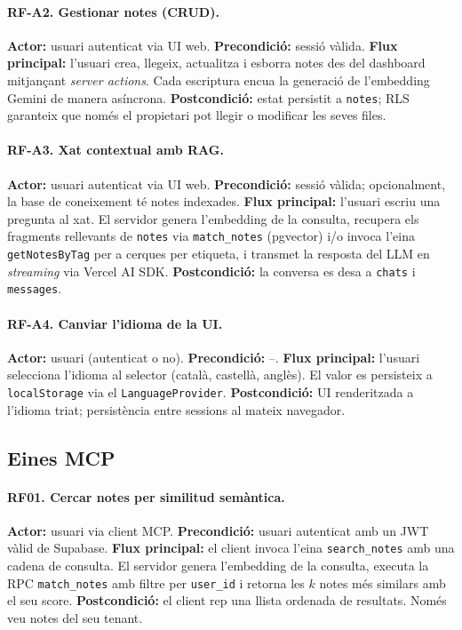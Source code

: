 \paragraph{RF-A2. Gestionar notes (CRUD).}
\textbf{Actor:} usuari autenticat via UI web.
\textbf{Precondició:} sessió vàlida.
\textbf{Flux principal:} l'usuari crea, llegeix, actualitza i esborra
notes des del dashboard mitjançant \emph{server actions}. Cada
escriptura encua la generació de l'embedding Gemini de manera
asíncrona.
\textbf{Postcondició:} estat persistit a \texttt{notes}; RLS garanteix
que només el propietari pot llegir o modificar les seves files.

\paragraph{RF-A3. Xat contextual amb RAG.}
\textbf{Actor:} usuari autenticat via UI web.
\textbf{Precondició:} sessió vàlida; opcionalment, la base de
coneixement té notes indexades.
\textbf{Flux principal:} l'usuari escriu una pregunta al xat. El
servidor genera l'embedding de la consulta, recupera els fragments
rellevants de \texttt{notes} via \texttt{match\_notes} (pgvector)
i/o invoca l'eina \texttt{getNotesByTag} per a cerques per etiqueta,
i transmet la resposta del LLM en \emph{streaming} via Vercel AI SDK.
\textbf{Postcondició:} la conversa es desa a \texttt{chats} i
\texttt{messages}.

\paragraph{RF-A4. Canviar l'idioma de la UI.}
\textbf{Actor:} usuari (autenticat o no).
\textbf{Precondició:} --.
\textbf{Flux principal:} l'usuari selecciona l'idioma al selector
(català, castellà, anglès). El valor es persisteix a
\texttt{localStorage} via el \texttt{LanguageProvider}.
\textbf{Postcondició:} UI renderitzada a l'idioma triat; persistència
entre sessions al mateix navegador.

\subsection{Eines MCP}

\paragraph{RF01. Cercar notes per similitud semàntica.}
\textbf{Actor:} usuari via client MCP.
\textbf{Precondició:} usuari autenticat amb un JWT vàlid de Supabase.
\textbf{Flux principal:} el client invoca l'eina \texttt{search\_notes}
amb una cadena de consulta. El servidor genera l'embedding de la
consulta, executa la RPC \texttt{match\_notes} amb filtre per
\texttt{user\_id} i retorna les $k$ notes més similars amb el seu score.
\textbf{Postcondició:} el client rep una llista ordenada de resultats.
Només veu notes del seu tenant.

